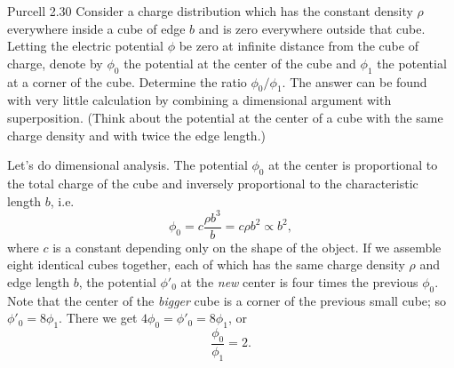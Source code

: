 \documentclass{esg8022pset}
\renewcommand{\d}{\,d}
\begin{document}
\begin{problem}{Purcell 2.30}
  Consider a charge distribution which has the constant density $\rho$ everywhere inside a cube of edge $b$ and is zero everywhere outside that cube. Letting the electric potential $\phi$ be zero at infinite distance from the cube of charge, denote by $\phi_0$ the potential at the center of the cube and $\phi_1$ the potential at a corner of the cube. Determine the ratio $\phi_0/\phi_1$. The answer can be found with very little calculation by combining a dimensional argument with superposition. (Think about the potential at the center of a cube with the same charge density and with twice the edge length.) 
\end{problem}
\begin{solution}
%
  Let's do dimensional analysis.  The potential $\phi_0$ at the center
  is proportional to the total charge of the cube and inversely
  proportional to the characteristic length $b$, i.e.
  \begin{equation*}
    \phi_0 = c \frac{\rho b^3}{b}= c \rho b^2 \propto b^2,
  \end{equation*}
  where $c$ is a constant depending only on the shape of the object.  If
  we assemble eight identical cubes together, each of which has the same
  charge density $\rho$ and edge length $b$, the potential $\phi'_0$ at
  the \emph{new} center is four times the previous $\phi_0$.  Note that the center of the
  \emph{bigger} cube is a corner of the previous small cube; so
  $\phi'_0=8\phi_1$.  There we get $4\phi_0=\phi'_0=8\phi_1$, or
  \[\frac{\phi_0}{\phi_1}=2.\]
  

\end{solution}
\end{document}
